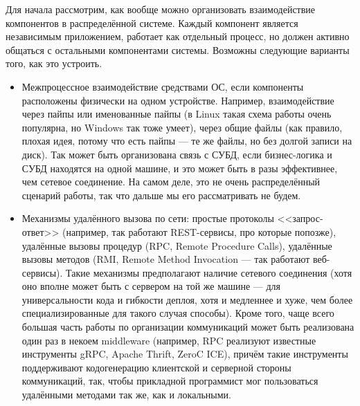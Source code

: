 \documentclass{../../text-style}
\begin{document}
Для начала рассмотрим, как вообще можно организовать взаимодействие компонентов в распределённой системе. Каждый компонент является независимым приложением, работает как отдельный процесс, но должен активно общаться с остальными компонентами системы. Возможны следующие варианты того, как это устроить.

\begin{itemize}
    \item Межпроцессное взаимодействие средствами ОС, если компоненты расположены физически на одном устройстве. Например, взаимодействие через пайпы или именованные пайпы (в Linux такая схема работы очень популярна, но Windows так тоже умеет), через общие файлы (как правило, плохая идея, потому что есть пайпы --- те же файлы, но без долгой записи на диск). Так может быть организована связь с СУБД, если бизнес-логика и СУБД находятся на одной машине, и это может быть в разы эффективнее, чем сетевое соединение. На самом деле, это не очень распределённый сценарий работы, так что дальше мы его рассматривать не будем.
    \item Механизмы удалённого вызова по сети: простые протоколы <<запрос-ответ>> (например, так работают REST-сервисы, про которые попозже), удалённые вызовы процедур (RPC, Remote Procedure Calls), удалённые вызовы методов (RMI, Remote Method Invocation --- так работают веб-сервисы). Такие механизмы предполагают наличие сетевого соединения (хотя оно вполне может быть с сервером на той же машине --- для универсальности кода и гибкости деплоя, хотя и медленнее и хуже, чем более специализированные для такого случая способы). Кроме того, чаще всего большая часть работы по организации коммуникаций может быть реализована один раз в некоем middleware (например, RPC реализуют известные инструменты gRPC, Apache Thrift, ZeroC ICE), причём такие инструменты поддерживают кодогенерацию клиентской и серверной стороны коммуникаций, так, чтобы прикладной программист мог пользоваться удалёнными методами так же, как и локальными.

\end{itemize}
\end{document}
